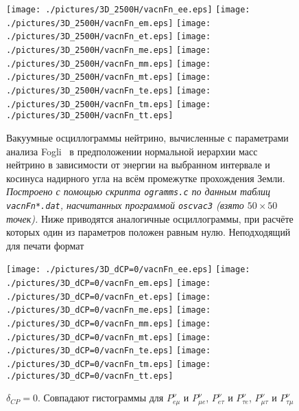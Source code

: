 \begin{figure}[!ht]
\texttt{[image: ./pictures/3D\_2500H/vacnFn\_ee.eps]}\hspace*{-2mm}
\texttt{[image: ./pictures/3D\_2500H/vacnFn\_em.eps]}\hspace*{-2mm}
\texttt{[image: ./pictures/3D\_2500H/vacnFn\_et.eps]}\hspace*{-2mm}
\texttt{[image: ./pictures/3D\_2500H/vacnFn\_me.eps]}\hspace*{-2mm}
\texttt{[image: ./pictures/3D\_2500H/vacnFn\_mm.eps]}\hspace*{-2mm}
\texttt{[image: ./pictures/3D\_2500H/vacnFn\_mt.eps]}\hspace*{-2mm}
\texttt{[image: ./pictures/3D\_2500H/vacnFn\_te.eps]}\hspace*{-2mm}
\texttt{[image: ./pictures/3D\_2500H/vacnFn\_tm.eps]}\hspace*{-2mm}
\texttt{[image: ./pictures/3D\_2500H/vacnFn\_tt.eps]}
\caption{Вакуумные осциллограммы нейтрино, вычисленные с параметрами анализа Fogli~\cite{Fogli:2012ua} в предположении нормальной иерархии масс нейтрино в зависимости от энергии на выбранном интервале и косинуса надирного угла на всём промежутке прохождения Земли. \textit{Построено с помощью скрипта \texttt{ogramms.c} по данным таблиц \texttt{vacnFn*.dat}, насчитанных программой \texttt{oscvac3} (взято $50\times50$ точек).} Ниже приводятся аналогичные осциллограммы, при расчёте которых один из параметров положен равным нулю. {\color{magenta}Неподходящий для печати формат}}
\label{vacn3DFn_ex}
\end{figure}
\begin{figure}[!ht]
\vspace*{-0.75cm}
\texttt{[image: ./pictures/3D\_dCP=0/vacnFn\_ee.eps]}\hspace*{-2mm}
\texttt{[image: ./pictures/3D\_dCP=0/vacnFn\_em.eps]}\hspace*{-2mm}
\texttt{[image: ./pictures/3D\_dCP=0/vacnFn\_et.eps]}\hspace*{-2mm}
\texttt{[image: ./pictures/3D\_dCP=0/vacnFn\_me.eps]}\hspace*{-2mm}
\texttt{[image: ./pictures/3D\_dCP=0/vacnFn\_mm.eps]}\hspace*{-2mm}
\texttt{[image: ./pictures/3D\_dCP=0/vacnFn\_mt.eps]}\hspace*{-2mm}
\texttt{[image: ./pictures/3D\_dCP=0/vacnFn\_te.eps]}\hspace*{-2mm}
\texttt{[image: ./pictures/3D\_dCP=0/vacnFn\_tm.eps]}\hspace*{-2mm}
\texttt{[image: ./pictures/3D\_dCP=0/vacnFn\_tt.eps]}
\caption{$\delta_{CP}=0$. Совпадают гистограммы для $P^{\nu}_{e\mu}$ и $P^{\nu}_{\mu{}e}$, $P^{\nu}_{e\tau}$ и $P^{\nu}_{\tau{}e}$, $P^{\nu}_{\mu\tau}$ и $P^{\nu}_{\tau\mu}$}
\label{vacn3DFn_dCP=0}
\end{figure}

